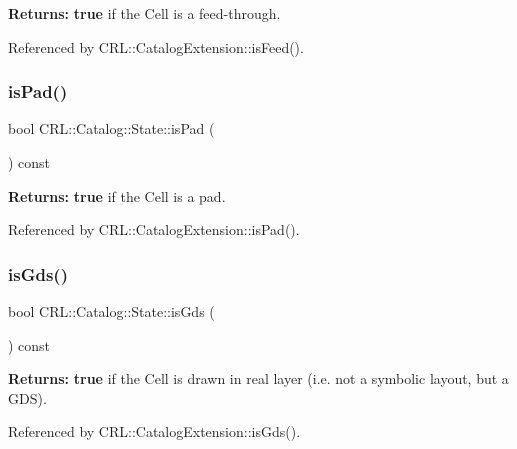{\bfseries Returns\+:} {\bfseries true} if the Cell is a feed-\/through. 

Referenced by C\+R\+L\+::\+Catalog\+Extension\+::is\+Feed().

\mbox{\label{classCRL_1_1Catalog_1_1State_a457e8dcf1928e6df40ec9f686350c2d0}} 
\subsubsection{\texorpdfstring{is\+Pad()}{isPad()}}
{\footnotesize\ttfamily bool C\+R\+L\+::\+Catalog\+::\+State\+::is\+Pad (\begin{DoxyParamCaption}{ }\end{DoxyParamCaption}) const\hspace{0.3cm}{\ttfamily [inline]}}

{\bfseries Returns\+:} {\bfseries true} if the Cell is a pad. 

Referenced by C\+R\+L\+::\+Catalog\+Extension\+::is\+Pad().

\mbox{\label{classCRL_1_1Catalog_1_1State_a7af8d732bf9cea0b0ddb4eca3b0528ec}} 
\subsubsection{\texorpdfstring{is\+Gds()}{isGds()}}
{\footnotesize\ttfamily bool C\+R\+L\+::\+Catalog\+::\+State\+::is\+Gds (\begin{DoxyParamCaption}{ }\end{DoxyParamCaption}) const\hspace{0.3cm}{\ttfamily [inline]}}

{\bfseries Returns\+:} {\bfseries true} if the Cell is drawn in real layer (i.\+e. not a symbolic layout, but a G\+DS). 

Referenced by C\+R\+L\+::\+Catalog\+Extension\+::is\+Gds().

\mbox{\label{classCRL_1_1Catalog_1_1State_ac6df038ecb133b973f9b9f2a5e858ca5}} 
